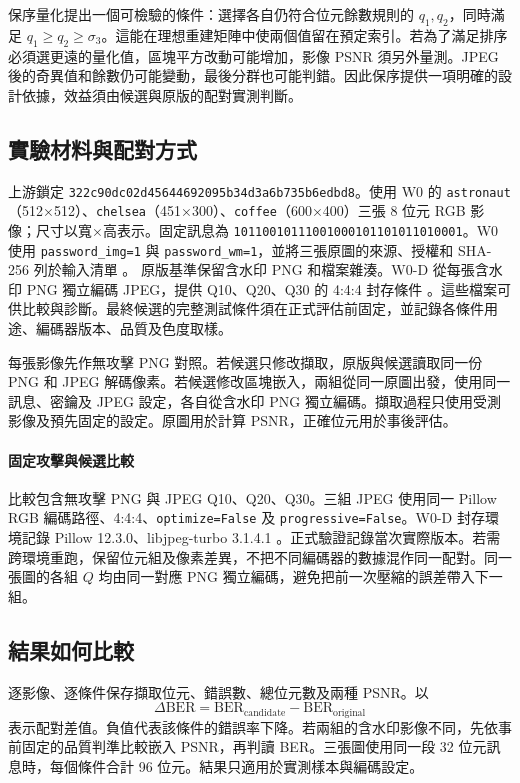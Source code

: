\documentclass[12pt,a4paper,onecolumn]{article}
\begin{document}
保序量化提出一個可檢驗的條件：選擇各自仍符合位元餘數規則的 \(q_1,q_2\)，同時滿足 \(q_1\ge q_2\ge \sigma_3\)。這能在理想重建矩陣中使兩個值留在預定索引。若為了滿足排序必須選更遠的量化值，區塊平方改動可能增加，影像 PSNR 須另外量測。JPEG 後的奇異值和餘數仍可能變動，最後分群也可能判錯。因此保序提供一項明確的設計依據，效益須由候選與原版的配對實測判斷。

\subsection{實驗材料與配對方式}
上游鎖定 \nolinkurl{322c90dc02d45644692095b34d3a6b735b6edbd8}。使用 W0 的 \texttt{astronaut}（512×512）、\texttt{chelsea}（451×300）、\texttt{coffee}（600×400）三張 8 位元 RGB 影像；尺寸以寬×高表示。固定訊息為 \texttt{10110010111001000101101011010001}。W0 使用 \texttt{password\_img=1} 與 \texttt{password\_wm=1}，並將三張原圖的來源、授權和 SHA-256 列於輸入清單 \cite{inputs,w0}。
原版基準保留含水印 PNG 和檔案雜湊。W0-D 從每張含水印 PNG 獨立編碼 JPEG，提供 Q10、Q20、Q30 的 4:4:4 封存條件 \cite{w0d}。這些檔案可供比較與診斷。最終候選的完整測試條件須在正式評估前固定，並記錄各條件用途、編碼器版本、品質及色度取樣。

每張影像先作無攻擊 PNG 對照。若候選只修改擷取，原版與候選讀取同一份 PNG 和 JPEG 解碼像素。若候選修改區塊嵌入，兩組從同一原圖出發，使用同一訊息、密鑰及 JPEG 設定，各自從含水印 PNG 獨立編碼。擷取過程只使用受測影像及預先固定的設定。原圖用於計算 PSNR，正確位元用於事後評估。

\paragraph{固定攻擊與候選比較}
比較包含無攻擊 PNG 與 JPEG Q10、Q20、Q30。三組 JPEG 使用同一 Pillow RGB 編碼路徑、4:4:4、\texttt{optimize=False} 及 \texttt{progressive=False}。W0-D 封存環境記錄 Pillow 12.3.0、libjpeg-turbo 3.1.4.1 \cite{w0d}。正式驗證記錄當次實際版本。若需跨環境重跑，保留位元組及像素差異，不把不同編碼器的數據混作同一配對。同一張圖的各組 \(Q\) 均由同一對應 PNG 獨立編碼，避免把前一次壓縮的誤差帶入下一組。

\subsection{結果如何比較}
逐影像、逐條件保存擷取位元、錯誤數、總位元數及兩種 PSNR。以
\[
 \Delta\mathrm{BER}=\mathrm{BER}_{\mathrm{candidate}}-\mathrm{BER}_{\mathrm{original}}
\]
表示配對差值。負值代表該條件的錯誤率下降。若兩組的含水印影像不同，先依事前固定的品質判準比較嵌入 PSNR，再判讀 BER。三張圖使用同一段 32 位元訊息時，每個條件合計 96 位元。結果只適用於實測樣本與編碼設定。
\end{document}
